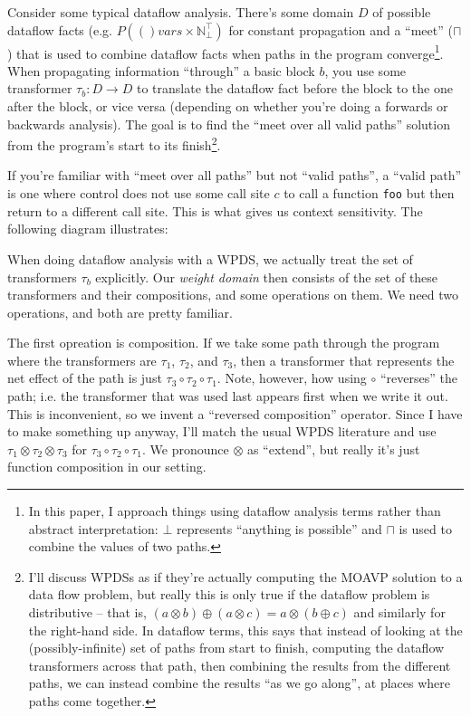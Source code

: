 \documentclass{article}
\newcommand{\Code}[1]{\texttt{#1}}
\newcommand{\powerset}[1]{P(#1)}
\newcommand{\bbN}{\mathbb{N}}
\newcommand{\meet}{\sqcap}
\newcommand{\extend}{\otimes}
\newcommand{\combine}{\oplus}
\begin{document}
Consider some typical dataflow analysis. There's some domain $D$ of
possible dataflow facts (e.g. $\powerset(vars \times \bbN_\bot^\top)$
for constant propagation and a ``meet'' ($\meet$) that is used to
combine dataflow facts when paths in the program converge\footnote{In
  this paper, I approach things using dataflow analysis terms
  rather than abstract interpretation: $\bot$ represents ``anything is
  possible'' and $\meet$ is used to combine the values of two paths.}.
When propagating information ``through'' a basic block $b$, you use
some transformer $\tau_b: D \rightarrow D$ to translate the dataflow
fact before the block to the one after the block, or vice versa
(depending on whether you're doing a forwards or backwards
analysis). The goal is to find the ``meet over all valid paths''
solution from the program's start to its finish\footnote{I'll discuss
  WPDSs as if they're actually computing the MOAVP solution to a data
  flow problem, but really this is only true if the dataflow problem
  is distributive -- that is, $(a \extend b) \combine (a \extend c) =
  a \extend (b \combine c)$ and similarly for the right-hand side. In
  dataflow terms, this says that instead of looking at the
  (possibly-infinite) set of paths from start to finish, computing the
  dataflow transformers across that path, then combining the results
  from the different paths, we can instead combine the results ``as we
  go along'', at places where paths come together.}.

If you're familiar with ``meet over all paths'' but not ``valid
paths'', a ``valid path'' is one where control does not use some call
site $c$ to call a function \Code{foo} but then return to a different
call site. This is what gives us context sensitivity. The following
diagram illustrates:

When doing dataflow analysis with a WPDS, we actually treat the set of
transformers $\tau_b$ explicitly. Our \emph{weight domain} then
consists of the set of these transformers and their compositions, and
some operations on them. We need two operations, and both are pretty
familiar.

The first opreation is composition. If we take some path through the
program where the transformers are $\tau_1$, $\tau_2$, and $\tau_3$,
then a transformer that represents the net effect of the path is just
$\tau_3 \circ \tau_2 \circ \tau_1$. Note, however, how using $\circ$
``reverses'' the path; i.e. the transformer that was used last appears
first when we write it out. This is inconvenient, so we invent a
``reversed composition'' operator. Since I have to make something up
anyway, I'll match the usual WPDS literature and use $\tau_1 \extend
\tau_2 \extend \tau_3$ for $\tau_3 \circ \tau_2 \circ \tau_1$. We
pronounce $\extend$ as ``extend'', but really it's just function
composition in our setting.
\end{document}
